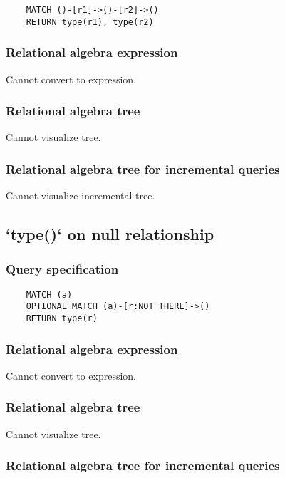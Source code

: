 	\begin{lstlisting}
	MATCH ()-[r1]->()-[r2]->()
	RETURN type(r1), type(r2)
	\end{lstlisting}


	\subsubsection*{Relational algebra expression}

	Cannot convert to expression.

	\subsubsection*{Relational algebra tree}

	Cannot visualize tree.

	\subsubsection*{Relational algebra tree for incremental queries}

	Cannot visualize incremental tree.
	\subsection{`type()` on null relationship}

	\subsubsection*{Query specification}

	\begin{lstlisting}
	MATCH (a)
	OPTIONAL MATCH (a)-[r:NOT_THERE]->()
	RETURN type(r)
	\end{lstlisting}


	\subsubsection*{Relational algebra expression}

	Cannot convert to expression.

	\subsubsection*{Relational algebra tree}

	Cannot visualize tree.

	\subsubsection*{Relational algebra tree for incremental queries}

